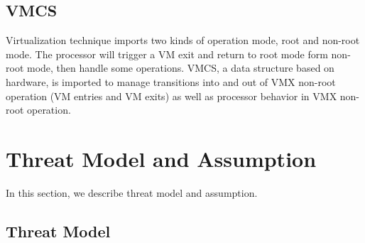 \documentclass[conference]{IEEEtran}
\begin{document}
\subsection{VMCS}
Virtualization technique imports two kinds of operation mode, root and non-root mode. The processor will trigger a VM exit and return to root mode form non-root mode, then handle some operations. VMCS, a data structure based on hardware, is imported to manage transitions into and out of VMX non-root operation (VM entries and VM exits) as well as processor behavior in VMX non-root operation.

\fi






\section{Threat Model and Assumption}

In this section, we describe threat model and assumption.


\subsection{Threat Model} \label {threat}

\end{document}
